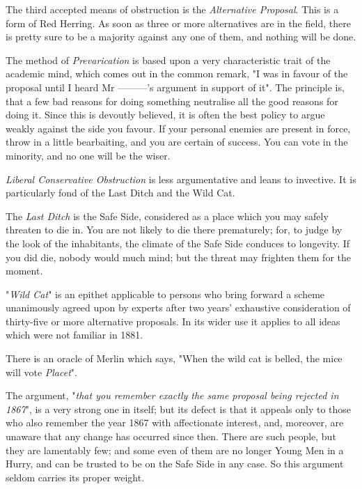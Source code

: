 \documentclass[12pt, oneside, b5paper]{memoir}
\begin{document}
The third accepted means of obstruction is the \emph{Alternative Proposal}. This is a form of Red Herring. As soon as three or more alternatives are in the field, there is pretty sure to be a majority against any one of them, and nothing will be done.

The method of \emph{Prevarication} is based upon a very characteristic trait of the academic mind, which comes out in the common remark, "I was in favour of the proposal until I heard Mr ---------'s argument in support of it". The principle is, that a few bad reasons for doing something neutralise all the good reasons for doing it. Since this is devoutly believed, it is often the best policy to argue weakly against the side you favour. If your personal enemies are present in force, throw in a little bearbaiting, and you are certain of success. You can vote in the minority, and no one will be the wiser.

\emph{Liberal Conservative Obstruction} is less argumentative and leans to invective. It is particularly fond of the Last Ditch and the Wild Cat.

The \emph{Last Ditch} is the Safe Side, considered as a place which you may safely threaten to die in. You are not likely to die there prematurely; for, to judge by the look of the inhabitants, the climate of the Safe Side conduces to longevity. If you did die, nobody would much mind; but the threat may frighten them for the moment.

"\emph{Wild Cat}" is an epithet applicable to persons who bring forward a scheme unanimously agreed upon by experts after two years' exhaustive consideration of thirty-five or more alternative proposals. In its wider use it applies to all ideas which were not familiar in 1881.

There is an oracle of Merlin which says, "When the wild cat is belled, the mice will vote \emph{Placet}".

The argument, "\emph{that you remember exactly the same proposal being rejected in 1867}", is a very strong one in itself; but its defect is that it appeals only to those who also remember the year 1867 with affectionate interest, and, moreover, are unaware that any change has occurred since then. There are such people, but they are lamentably few; and some even of them are no longer Young Men in a Hurry, and can be trusted to be on the Safe Side in any case. So this argument seldom carries its proper weight.
\end{document}
